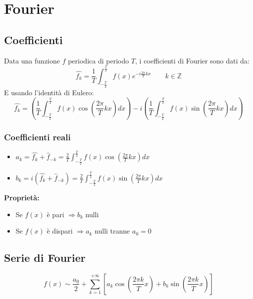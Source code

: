 \documentclass[10pt, a4paper]{article}
\begin{document}
\section{Fourier}
    \subsection{Coefficienti}
        Data una funzione $f$ periodica di periodo $T$, i coefficienti di Fourier sono dati da:
        \begin{equation*}
            \hat{f_k}=\frac{1}{T}\int_{-\frac{T}{2}}^{\frac{T}{2}}f(x)e^{-i\frac{2\pi}{T}kx} \qquad k\in\mathbb{Z}
        \end{equation*}
        E usando l'identità di Eulero:
        \begin{equation*}
            \hat{f_k}=\left(\frac{1}{T}\int_{-\frac{T}{2}}^{\frac{T}{2}}f(x)\cos\left(\frac{2\pi}{T}kx\right)dx\right)-i\left(\frac{1}{T}\int_{-\frac{T}{2}}^{\frac{T}{2}}f(x)\sin\left(\frac{2\pi}{T}kx\right)dx\right)
        \end{equation*}
        \subsubsection{Coefficienti reali}
        \begin{itemize}
            \item $a_k=\hat{f_k}+\hat{f}_{-k}=\frac{2}{T}\int_{-\frac{T}{2}}^{\frac{T}{2}}f(x)\cos\left(\frac{2\pi}{T}kx\right)dx$
            \item $b_k=i(\hat{f_k}+\hat{f}_{-k})=\frac{2}{T}\int_{-\frac{T}{2}}^{\frac{T}{2}}f(x)\sin\left(\frac{2\pi}{T}kx\right)dx$
        \end{itemize}
        \textbf{Proprietà:} \begin{itemize}
            \item Se $f(x)$ è pari $\Rightarrow b_k$ nulli
            \item Se $f(x)$ è dispari $\Rightarrow a_k$ nulli tranne $a_0=0$
        \end{itemize}
    \subsection{Serie di Fourier}
        \begin{equation*}
            f(x)\sim \frac{a_0}{2}+\sum_{k=1}^{+\infty}\left[a_k\cos\left(\frac{2\pi k}{T}x\right)+b_k\sin\left(\frac{2\pi k}{T}x\right)\right]
        \end{equation*}
\end{document}
